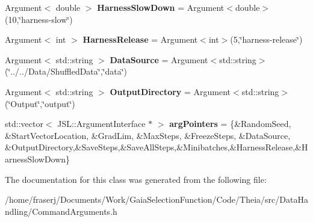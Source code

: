 \begin{DoxyCompactItemize}
\mbox{\label{classCommandArgs_ae64dd25052a877832d3db4e289f1bb13}} 
Argument$<$ double $>$ {\bfseries Harness\+Slow\+Down} = Argument$<$double$>$(10,\char`\"{}harness-\/slow\char`\"{})
\item 
\mbox{\label{classCommandArgs_a2a92d19a8106254917659b8d432b8fd2}} 
Argument$<$ int $>$ {\bfseries Harness\+Release} = Argument$<$int$>$(5,\char`\"{}harness-\/release\char`\"{})
\item 
\mbox{\label{classCommandArgs_a5e4469cda4fd80e0d827a11147b15afa}} 
Argument$<$ std\+::string $>$ {\bfseries Data\+Source} = Argument$<$std\+::string$>$(\char`\"{}../../Data/Shuffled\+Data\char`\"{},\char`\"{}data\char`\"{})
\item 
\mbox{\label{classCommandArgs_adf5dd695a6a88eed97d1317d534af4d6}} 
Argument$<$ std\+::string $>$ {\bfseries Output\+Directory} = Argument$<$std\+::string$>$(\char`\"{}Output\char`\"{},\char`\"{}output\char`\"{})
\item 
\mbox{\label{classCommandArgs_ab0522bf4c5550780b9ff929fbc272f72}} 
std\+::vector$<$ J\+S\+L\+::\+Argument\+Interface $\ast$ $>$ {\bfseries arg\+Pointers} = \{\&Random\+Seed, \&Start\+Vector\+Location, \&Grad\+Lim, \&Max\+Steps, \&Freeze\+Steps, \&Data\+Source, \&Output\+Directory,\&Save\+Steps,\&Save\+All\+Steps,\&Minibatches,\&Harness\+Release,\&Harness\+Slow\+Down\}
\end{DoxyCompactItemize}


The documentation for this class was generated from the following file\+:\begin{DoxyCompactItemize}
\item 
/home/fraserj/\+Documents/\+Work/\+Gaia\+Selection\+Function/\+Code/\+Theia/src/\+Data\+Handling/Command\+Arguments.\+h\end{DoxyCompactItemize}
